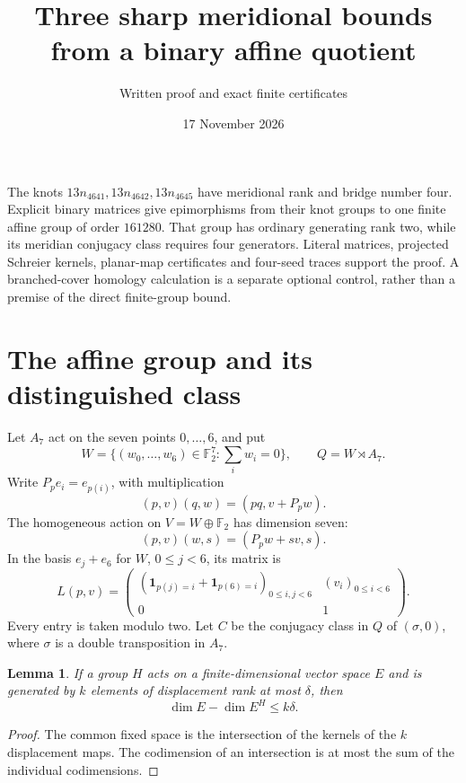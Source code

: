 \documentclass[11pt]{article}
\title{Three sharp meridional bounds from a binary affine quotient}
\author{Written proof and exact finite certificates}
\date{17 November 2026}
\newtheorem{lemma}{Lemma}
\newcommand{\F}{\mathbb F}
\begin{document}
\maketitle

The knots $13n_{4641},13n_{4642},13n_{4645}$ have meridional rank
and bridge number four. Explicit binary matrices give epimorphisms
from their knot groups to one finite affine group of order $161280$.
That group has ordinary generating rank two, while its meridian
conjugacy class requires four generators. Literal matrices, projected
Schreier kernels, planar-map certificates and four-seed traces support
the proof. A branched-cover homology calculation is a separate optional
control, rather than a premise of the direct finite-group bound.

\section{The affine group and its distinguished class}

Let $A_7$ act on the seven points $0,\ldots,6$, and put
\[
 W=\{(w_0,\ldots,w_6)\in\F_2^7:\textstyle\sum_iw_i=0\},
 \qquad Q=W\rtimes A_7.
\]
Write $P_pe_i=e_{p(i)}$, with multiplication
\[
                  (p,v)(q,w)=(pq,v+P_pw).
\]
The homogeneous action on $V=W\oplus\F_2$ has dimension seven:
\[
                  (p,v)(w,s)=(P_pw+sv,s).
\]
In the basis $e_j+e_6$ for $W$, $0\le j<6$, its matrix is
\begin{equation}\label{eq:matrix}
 L(p,v)=\begin{pmatrix}
 (\mathbf1_{p(j)=i}+\mathbf1_{p(6)=i})_{0\le i,j<6}
       &(v_i)_{0\le i<6}\\0&1
 \end{pmatrix}.
\end{equation}
Every entry is taken modulo two. Let $C$ be the conjugacy class in
$Q$ of $(\sigma,0)$, where $\sigma$ is a double transposition in $A_7$.

\begin{lemma}\label{lem:fixed}
If a group $H$ acts on a finite-dimensional vector space $E$ and is
generated by $k$ elements of displacement rank at most $\delta$,
then
\[
                     \dim E-\dim E^H\le k\delta.
\]
\end{lemma}
\begin{proof}
The common fixed space is the intersection of the kernels of the
$k$ displacement maps. The codimension of an intersection is at
most the sum of the individual codimensions.
\end{proof}
\end{document}
